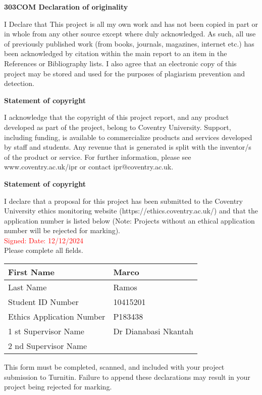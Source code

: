 \newpage

\begin{Large} 
\textbf{303COM Declaration of originality} \\
\end{Large}
I Declare that This project is all my own work and has not been
copied in part or in whole from any other source except where duly acknowledged. As such, all use of previously published work (from
books, journals, magazines, internet etc.) has been acknowledged
by citation within the main report to an item in the References or Bibliography lists. I also agree that an electronic copy of this project may be stored and used for the purposes of plagiarism prevention and detection. \\

\begin{Large} 
	\textbf{Statement of copyright} \\
\end{Large}
I acknowledge that the copyright of this project report, and any
product developed as part of the project, belong to Coventry University. Support, including funding, is available to commercialize
products and services developed by staff and students. Any
revenue that is generated is split with the inventor/s of the product or service. For further information, please see www.coventry.ac.uk/ipr or contact ipr@coventry.ac.uk. \\

\begin{Large} 
	\textbf{Statement of copyright} \\
\end{Large}
I declare that a proposal for this project has been submitted to
the Coventry University ethics
monitoring website (https://ethics.coventry.ac.uk/) and that the
application number is listed below
(Note: Projects without an ethical application number will be
rejected for marking). \\

\noindent \textcolor{red}{Signed: Date: 12/12/2024} \\

\noindent Please complete all fields.

\begin{table}[H]
	\centering
	\begin{tabular}{|l|p{8cm}|}
		\hline	First Name & Marco \\
		\hline Last Name & Ramos \\
		\hline Student ID Number & 10415201 \\
		\hline Ethics Application Number & P183438 \\
		\hline 1 st Supervisor Name & Dr Dianabasi Nkantah \\
		\hline 2 nd Supervisor Name & {} \\
		\hline
	\end{tabular}
\end{table}

\noindent This form must be completed, scanned, and included with your project submission to Turnitin. Failure to append these declarations may result in your project being rejected for
marking.
